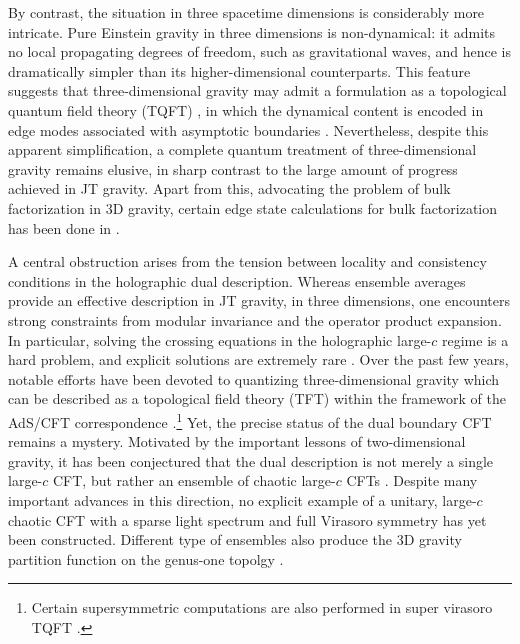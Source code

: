 \documentclass[12 pt]{article}
\begin{document}
\noindent
By contrast, the situation in three spacetime dimensions is considerably more intricate. Pure Einstein gravity in three dimensions is non-dynamical: it admits no local propagating degrees of freedom, such as gravitational waves, and hence is dramatically simpler than its higher-dimensional counterparts. This feature suggests that three-dimensional gravity may admit a formulation as a topological quantum field theory (TQFT) \cite{Mikhaylov:2017ngi,Atiyah:1989vu,Witten:2007kt,Collier:2024mgv,Yan:2023rjh}, in which the dynamical content is encoded in edge modes  associated with asymptotic boundaries \cite{Belaey:2025ijg,Blommaert:2018rsf}. Nevertheless, despite this apparent simplification, a complete quantum treatment of three-dimensional gravity remains elusive, in sharp contrast to the large amount of progress achieved in JT gravity. Apart from this, advocating the problem of bulk factorization in 3D gravity, certain edge state calculations for bulk factorization has been done in \cite{Mertens:2022ujr}.\\ \par
A central obstruction arises from the tension between locality and consistency conditions in the holographic dual description. Whereas ensemble averages provide an effective description in JT gravity, in three dimensions, one encounters strong constraints from modular invariance and the operator product expansion. In particular, solving the crossing equations in the holographic large-$c$ regime is a hard problem, and explicit solutions are extremely rare \cite{Benjamin:2019stq}. Over the past few years, notable efforts have been devoted to quantizing three-dimensional gravity which can be described as a topological field theory (TFT) within the framework of the AdS/CFT correspondence \cite{Collier:2023fwi}.\footnote{Certain supersymmetric computations are also performed in super virasoro TQFT \cite{Bhattacharyya:2024vnw,Eberhardt:2026hfh}.} Yet, the precise status of the dual boundary CFT remains a mystery. Motivated by the important lessons of two-dimensional gravity, it has been conjectured that the dual description is not merely a single large-$c$ CFT, but rather an ensemble of chaotic large-$c$ CFTs \cite{deBoer:2024mqg,Chandra:2022bqq,Belin:2023efa,Jafferis:2025jle,Jafferis:2025vyp,Jafferis:2025yxt,Hartman:2025ula,deBoer:2025oge}. Despite many important advances in this direction, no explicit example of a unitary, large-$c$ chaotic CFT with a sparse light spectrum and full Virasoro symmetry has yet been constructed. Different type of ensembles also produce the 3D gravity partition function on the genus-one topolgy \cite{Maloney:2020nni,Afkhami-Jeddi:2020ezh,Benjamin:2021wzr}.
\end{document}
